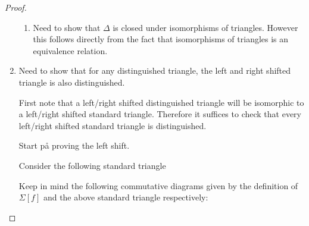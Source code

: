 \begin{proof}
\begin{enumerate}[label={(\bfseries TR\arabic*)}]
{\begin{enumerate}
{\begin{center}
                    \end{center}
                    However, it is a known fact the pushout of an isomorphism is an isomorphism. And so \( \gamma_{\Id} \) is an isomorphism, which implies \( C_{\Id} \cong 0 \) in \( \Mc \) because all injective modules are projective in \( \Mc \).
                }
                \item {
                    Need to show that \( \Delta \) is closed under isomorphisms of triangles. However this follows directly from the fact that isomorphisms of triangles is an equivalence relation.
                }
            \end{enumerate}
        }
        \item {
            Need to show that for any distinguished triangle, the left and right shifted triangle is also distinguished.

            First note that a left/right shifted distinguished triangle will be isomorphic to a left/right shifted standard triangle. Therefore it suffices to check that every left/right shifted standard triangle is distinguished.

            Start på proving the left shift.

            Consider the following standard triangle
            \begin{center}
            \end{center}

            Keep in mind the following commutative diagrams given by the definition of \( \Sigma [f] \) and the above standard triangle respectively:
            \begin{center}
\end{center}}
\end{enumerate}
\end{proof}
